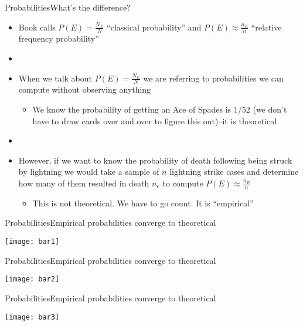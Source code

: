 \documentclass[xcolor=dvipsnames]{beamer}
\begin{document}
\begin{frame}{Probabilities}{What's the difference?}
	\begin{itemize}
		\item Book calls $P(E) = \frac{N_E}{N}$ ``classical probability'' and $P(E) \approx \frac{n_E}{n}$ ``relative frequency probability'' \pause
		\item[]
		\item When we talk about $P(E) = \frac{N_E}{N}$ we are referring to probabilities we can compute without observing anything \pause
		\begin{itemize}
			\item  We know the probability of getting an Ace of Spades is $1/52$ (we don't have to draw cards over and over to figure this out)--it is theoretical \pause
		\end{itemize}
	\item[]
	\item However, if we want to know the probability of death following being struck by lightning we would take a sample of $n$ lightning strike cases and determine how many of them resulted in death $n_e$ to compute $P(E) \approx \frac{n_E}{n}$ \pause
	\begin{itemize}
		\item This is not theoretical. We have to go count. It is ``empirical''
	\end{itemize}
	\end{itemize}
\end{frame}

\begin{frame}{Probabilities}{Empirical probabilities converge to theoretical}
	\begin{center}
		\texttt{[image: bar1]}
	\end{center}
\end{frame}

\begin{frame}{Probabilities}{Empirical probabilities converge to theoretical}
\begin{center}
	\texttt{[image: bar2]}
\end{center}
\end{frame}

\begin{frame}{Probabilities}{Empirical probabilities converge to theoretical}
\begin{center}
	\texttt{[image: bar3]}
\end{center}
\end{frame}
\end{document}
